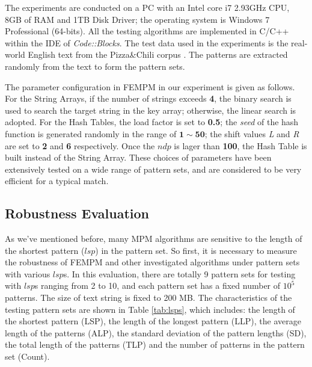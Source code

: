 \documentclass{article}
\begin{document}
The experiments are conducted on a PC with an Intel core i7 2.93GHz
CPU, 8GB of RAM and 1TB Disk Driver; the operating system is Windows 7
Professional (64-bits). All the testing algorithms are implemented in
C/C++ within the IDE of \emph{Code::Blocks}. The test data used in the
experiments is the real-world English text from the Pizza\;\&\;Chili
corpus \cite{pizzachil}. The patterns are extracted randomly from the
text to form the pattern sets.

The parameter configuration in \textsf{FEMPM} in our experiment is
given as follows. For the String Arrays, if the number of strings
exceeds \textbf{4}, the binary search is used to search the target
string in the key array; otherwise, the linear search is adopted. For
the Hash Tables, the load factor is set to \textbf{0.5}; the
\emph{seed} of the hash function is generated randomly in the range of
$\mathbf{1} \sim \mathbf{50}$; the shift values \emph{L} and \emph{R}
are set to \textbf{2} and \textbf{6} respectively. Once the $ndp$ is
lager than \textbf{100}, the Hash Table is built instead of the String
Array. These choices of parameters have been extensively tested on a
wide range of pattern sets, and are considered to be very efficient
for a typical match.

\subsection{Robustness Evaluation}

As we've mentioned before, many MPM algorithms are sensitive to the
length of the shortest pattern ($lsp$) in the pattern set. So first,
it is necessary to measure the robustness of \textsf{FEMPM} and other
investigated algorithms under pattern sets with various $lsp$s. In
this evaluation, there are totally 9 pattern sets for testing with
$lsp$s ranging from 2 to 10, and each pattern set has a fixed number
of $10^5$ patterns. The size of text string is fixed to 200 MB. The
characteristics of the testing pattern sets are shown in Table
\ref{tab:lsps}, which includes: the length of the shortest pattern
(LSP), the length of the longest pattern (LLP), the average length of
the patterns (ALP), the standard deviation of the pattern lengths
(SD), the total length of the patterns (TLP) and the number of
patterns in the pattern set (Count).
\end{document}
